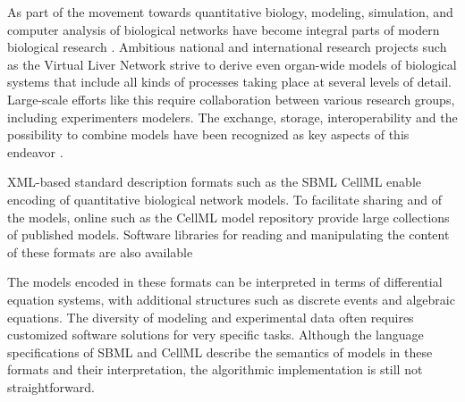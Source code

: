 \documentclass[10pt]{bmc_article}
\newenvironment{bmcformat}{\begin{raggedright}\baselineskip20pt\sloppy\setboolean{publ}{false}}{\end{raggedright}\baselineskip20pt\sloppy}
\begin{document}
\begin{bmcformat}
As part of the movement towards quantitative biology,  modeling, 
simulation, and computer analysis of biological networks have become integral
parts of modern biological research \cite{Macilwain2011}.
Ambitious national and international research projects such as the Virtual Liver
Network \cite{Holzhuetter2012} strive to derive even organ-wide models of
biological systems that include all kinds of processes taking place at several
levels of detail.
Large-scale efforts like this require  collaboration between various
research groups, including experimenters\COR{,} modelers.
The exchange, storage, interoperability\COR{,} and the possibility to combine models have been recognized as
key aspects of this endeavor \cite{Schulz2006, Klipp2007, Chelliah2009, Liebermeister2009sta}.

XML-based standard description formats %
such as the \acf{SBML} \cite{M.Hucka03012003, SBML2013}  CellML
\cite{Lloyd2004, CellML2013} enable encoding of quantitative biological network
models.
To facilitate sharing and  of the models, online 
such as  \cite{Li2010a}  the CellML model
repository \cite{Lloyd2008} provide large collections of published models.
Software libraries for reading and manipulating the content of these formats are
also available \cite{Bornstein2008, Miller2010, Draeger2011b}

The models encoded in these formats can be interpreted in terms of 
differential equation systems, with additional structures such as
discrete events and algebraic equations.
The diversity of modeling  and experimental data often requires
customized software solutions for very specific tasks.
Although the language specifications of \acs{SBML} \cite{Hucka2001, Hucka2003,
Finney2003a, Finney2006, Hucka2007, Hucka2008, Hucka2010a} 
and CellML \cite{Cuellar2006} describe the semantics of models in these formats
and their interpretation, the algorithmic implementation is still not
straightforward.


\end{bmcformat}
\end{document}
